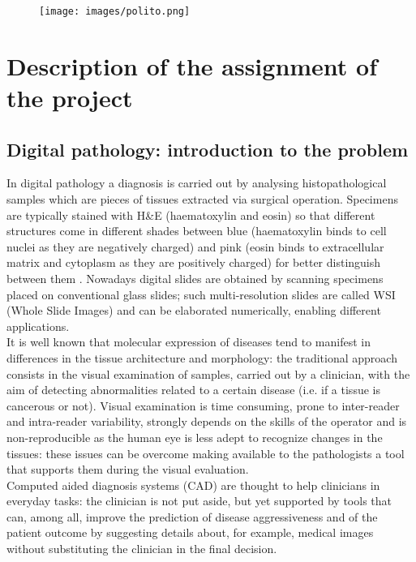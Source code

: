 \documentclass[12pt]{article}
\begin{document}
	
\begin{figure}
  \centering
  \texttt{[image: images/polito.png]}
\end{figure}

\maketitle
\newpage
\tableofcontents
\listoffigures
\newpage

\section{Description of the assignment of the project}
\subsection{Digital pathology: introduction to the problem}
In digital pathology a diagnosis is carried out by analysing histopathological samples which are pieces of tissues extracted via surgical operation. Specimens are typically stained with H\&E (haematoxylin and eosin) so that different structures come in different shades between blue (haematoxylin binds to cell nuclei as they are negatively charged) and pink (eosin binds to extracellular matrix and cytoplasm as they are positively charged) for better distinguish between them \cite{stain}. Nowadays digital slides are obtained by scanning specimens placed on conventional glass slides; such multi-resolution slides are called WSI (Whole Slide Images) and can be elaborated numerically, enabling different applications. \\ It is well known that molecular expression of diseases tend to manifest in differences in the tissue architecture and morphology: the traditional approach consists in the visual examination of samples, carried out by a clinician, with the aim of detecting abnormalities related to a certain disease (i.e. if a tissue is cancerous or not). Visual examination is time consuming, prone to inter-reader and intra-reader variability, strongly depends on the skills of the operator and is non-reproducible as the human eye is less adept to recognize changes in the tissues: these issues can be overcome making available to the pathologists a tool that supports them during the visual evaluation.\cite{digpat1} \\ Computed aided diagnosis systems (CAD) are thought to help clinicians in everyday tasks: the clinician is not put aside, but yet supported by tools that can, among all, improve the prediction of disease aggressiveness and of the patient outcome by suggesting details about, for example, medical images without substituting the clinician in the final decision. \cite{digpat2}
\end{document}
